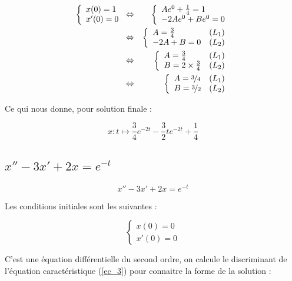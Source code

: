 \documentclass[a4paper, 11pt]{report} %
\renewcommand{\mapsto}{\longmapsto}
\begin{document}
\begin{eqnarray*}
\left\{\begin{array}{l}
x(0) = 1\\
x'(0) = 0
\end{array}\right. & \Leftrightarrow &
\left\{\begin{array}{l}
Ae^0 + \frac{1}{4} = 1\\
-2Ae^0 + Be^0 = 0
\end{array}\right.\\
& \Leftrightarrow &                     %
\left\{\begin{array}{ll}
A = \frac{3}{4} & (L_1)\\
-2A + B = 0 & (L_2)
\end{array}\right.\\
& \Leftrightarrow &                     %
\left\{\begin{array}{ll}
A = \frac{3}{4} & (L_1)\\
B = 2\times\frac{3}{4} & (L_2)
\end{array}\right.\\
& \Leftrightarrow &                     %
\left\{\begin{array}{ll}
A = \nicefrac{3}{4} & (L_1)\\
B = \nicefrac{3}{2} & (L_2)
\end{array}\right.\\
\end{eqnarray*}

Ce qui nous donne, pour solution finale :

\[
x : t \mapsto \frac{3}{4}e^{-2t} - \frac{3}{2}te^{-2t} + \frac{1}{4}
\]
\subsection{$x'' -3x' + 2x = e^{-t}$} %

\begin{equation}
x'' -3x' + 2x = e^{-t}
\label{equa_diff_4}
\end{equation}

Les conditions initiales sont les suivantes :

\[
\left\{\begin{array}{l}
x(0) = 0\\
x'(0) = 0
\end{array}\right.
\]

C'est une équation différentielle du second ordre, on calcule le discriminant de l'équation caractéristique (\ref{ec_3})
pour connaitre la forme de la solution :
\end{document}
